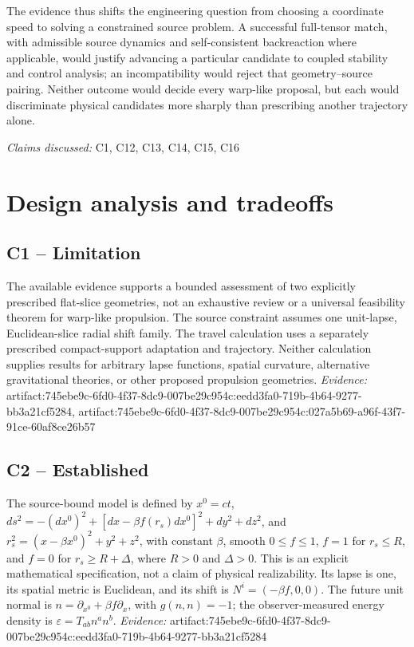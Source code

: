 \documentclass[11pt]{article}
\begin{document}
The evidence thus shifts the engineering question from choosing a coordinate speed to solving a constrained source problem. A successful full-tensor match, with admissible source dynamics and self-consistent backreaction where applicable, would justify advancing a particular candidate to coupled stability and control analysis; an incompatibility would reject that geometry–source pairing. Neither outcome would decide every warp-like proposal, but each would discriminate physical candidates more sharply than prescribing another trajectory alone.

\textit{Claims discussed: }C1, C12, C13, C14, C15, C16
\section{Design analysis and tradeoffs}
\subsection{C1 -- Limitation}
The available evidence supports a bounded assessment of two explicitly prescribed flat-slice geometries, not an exhaustive review or a universal feasibility theorem for warp-like propulsion.
The source constraint assumes one unit-lapse, Euclidean-slice radial shift family. The travel calculation uses a separately prescribed compact-support adaptation and trajectory. Neither calculation supplies results for arbitrary lapse functions, spatial curvature, alternative gravitational theories, or other proposed propulsion geometries.
\textit{Evidence: }artifact:745ebe9c-6fd0-4f37-8dc9-007be29c954c:eedd3fa0-719b-4b64-9277-bb3a21cf5284, artifact:745ebe9c-6fd0-4f37-8dc9-007be29c954c:027a5b69-a96f-43f7-91ce-60af8ce26b57
\subsection{C2 -- Established}
The source-bound model is defined by $x^0=ct$, $ds^2=-(dx^0)^2+[dx-\beta f(r_s)dx^0]^2+dy^2+dz^2$, and $r_s^2=(x-\beta x^0)^2+y^2+z^2$, with constant $\beta$, smooth $0\leq f\leq1$, $f=1$ for $r_s\leq R$, and $f=0$ for $r_s\geq R+\Delta$, where $R>0$ and $\Delta>0$.
This is an explicit mathematical specification, not a claim of physical realizability. Its lapse is one, its spatial metric is Euclidean, and its shift is $N^i=(-\beta f,0,0)$. The future unit normal is $n=\partial_{x^0}+\beta f\partial_x$, with $g(n,n)=-1$; the observer-measured energy density is $\varepsilon=T_{ab}n^an^b$.
\textit{Evidence: }artifact:745ebe9c-6fd0-4f37-8dc9-007be29c954c:eedd3fa0-719b-4b64-9277-bb3a21cf5284
\end{document}
